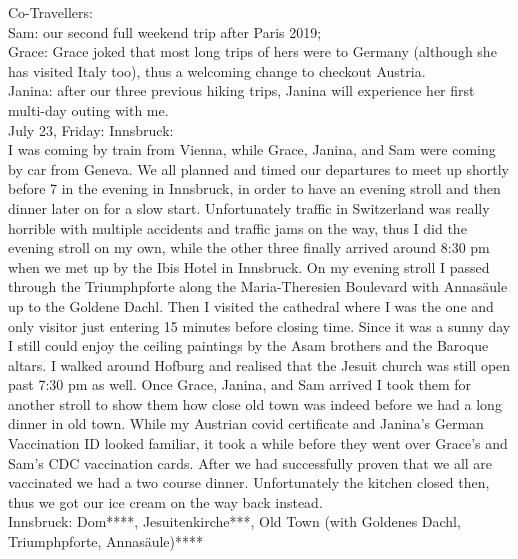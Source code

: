 {Co-Travellers:\\
Sam: our second full weekend trip after Paris 2019;\\
Grace: Grace joked that most long trips of hers were to Germany (although she has visited Italy too), thus a welcoming change to checkout Austria.\\
Janina: after our three previous hiking trips, Janina will experience her first multi-day outing with me.\\

July 23, Friday: Innsbruck:\\
I was coming by train from Vienna, while Grace, Janina, and Sam were coming by car from Geneva. We all planned and timed our departures to meet up shortly before 7 in the evening in Innsbruck, in order to have an evening stroll and then dinner later on for a slow start.
Unfortunately traffic in Switzerland was really horrible with multiple accidents and traffic jams on the way, thus I did the evening stroll on my own, while the other three finally arrived around 8:30 pm when we met up by the Ibis Hotel in Innsbruck. On my evening stroll I passed through the Triumphpforte along the Maria-Theresien Boulevard with Annas\"aule up to the Goldene Dachl. Then I visited the cathedral where I was the one and only visitor just entering 15 minutes before closing time. Since it was a sunny day I still could enjoy the ceiling paintings by the Asam brothers and the Baroque altars. I walked around Hofburg and realised that the Jesuit church was still open past 7:30 pm as well. Once Grace, Janina, and Sam arrived I took them for another stroll to show them how close old town was indeed before we had a long dinner in old town. While my Austrian covid certificate and Janina's German Vaccination ID looked familiar, it took a while before they went over Grace's and Sam's CDC vaccination cards. After we had successfully proven that we all are vaccinated we had a two course dinner. Unfortunately the kitchen closed then, thus we got our ice cream on the way back instead.\\

Innsbruck: Dom****, Jesuitenkirche***, Old Town (with Goldenes Dachl, Triumphpforte, Annas\"aule)****\\

}
